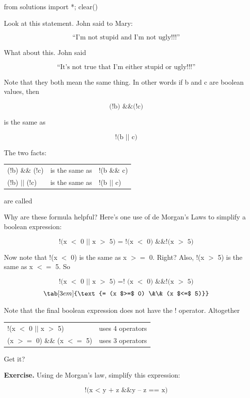 \begin{python0}
from solutions import *; clear()
\end{python0}

Look at this statement. John said to Mary:

\[\text{“I'm not stupid and I'm not ugly!!!”}\]

What about this. John said

\[\text{“It's not true that I'm either stupid or ugly!!!”}\]

Note that they both mean the same thing. In other words if b and c are
boolean values, then

\[\text{(!b) \&\& (!c)}\]

is the same as

\[\text{!(b $||$ c)}\]

The two facts:

\begin{tabular}{p{3cm} p{3cm} p{3cm}}
(!b) \&\& (!c) & is the same as & !(b \&\& c)\\
(!b) $||$ (!c) & is the same as & !(b $||$ c)\\
\end{tabular}

are called 

Why are these formula helpful? Here's one use of de Morgan's Laws to
simplify a boolean expression:

\[\text{!(x $<$ 0 $||$ x $>$ 5) = !(x $<$ 0) \&\& !(x $>$ 5)}\]

Now note that !(x $<$ 0) is the same as x $>=$ 0. Right? Also, !(x $>$ 5) is the same as x $<=$ 5. So

\[\text{!(x $<$ 0 $||$ x $>$ 5) =! (x $<$ 0) \&\& !(x $>$ 5)}\]
\[ \tab[3em]{\text{= (x $>=$ 0) \&\& (x $<=$ 5)}}\]

Note that the final boolean expression does not have the ! operator.
Altogether

\begin{tabular}{p{5cm} p{5cm}}
!(x $<$ 0 $||$ x $>$ 5) & uses 4 operators\\
(x $>=$ 0) \&\& (x $<=$ 5) & uses 3 operators\\
\end{tabular}

Get it?

\textbf{Exercise.} Using de Morgan's law, simplify this expression:

\[\text{!(x $<$ y + z \&\& y – z == x)}\]


